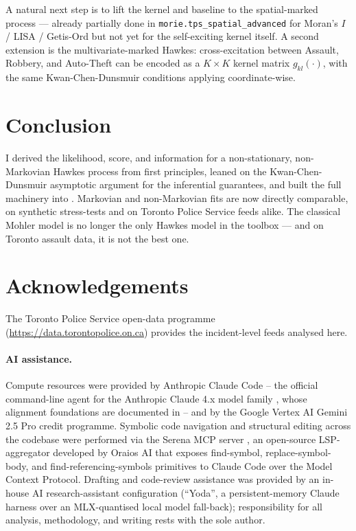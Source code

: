 \documentclass[article,shortnames,nojss]{jss}
\newcommand{\1}{\mathbbm{1}}
\theoremstyle{plain}
\theoremstyle{definition}
\begin{document}
A natural next step is to lift the kernel and baseline to the
spatial-marked process --- already partially done in
\texttt{morie.tps\_spatial\_advanced} for Moran's $I$ / LISA /
Getis-Ord but not yet for the self-exciting kernel itself.  A
second extension is the multivariate-marked Hawkes:
cross-excitation between Assault, Robbery, and Auto-Theft can be
encoded as a $K\times K$ kernel matrix
$g_{kl}(\cdot)$, with the same Kwan-Chen-Dunsmuir conditions
applying coordinate-wise.

\section{Conclusion}\label{sec:conclusion}

I derived the likelihood, score, and information for a
non-stationary, non-Markovian Hawkes process from first
principles, leaned on the Kwan-Chen-Dunsmuir asymptotic
argument for the inferential guarantees, and built the full
machinery into .  Markovian and non-Markovian fits
are now directly comparable, on synthetic stress-tests and on
Toronto Police Service feeds alike.  The classical Mohler
model is no longer the only Hawkes model in the toolbox ---
and on Toronto assault data, it is not the best one.

\section*{Acknowledgements}
The Toronto Police Service open-data programme
(\url{https://data.torontopolice.on.ca}) provides the incident-level
feeds analysed here.

\paragraph*{AI assistance.}
Compute resources were provided by Anthropic
Claude Code \citep{Anthropic2024ClaudeCode} -- the official
command-line agent for the Anthropic Claude 4.x model family
\citep{Anthropic2024ClaudeFamily}, whose alignment foundations
are documented in \citet{Bai2022ConstitutionalAI} -- and by the
Google Vertex AI \citep{GoogleCloud2024VertexAI} Gemini 2.5 Pro
\citep{GoogleDeepMind2024Gemini} credit programme.  Symbolic
code navigation and structural editing across the codebase were
performed via the Serena MCP server \citep{Oraios2024Serena}, an
open-source LSP-aggregator developed by Oraios AI that exposes
find-symbol, replace-symbol-body, and find-referencing-symbols
primitives to Claude Code over the Model Context Protocol.
Drafting and code-review assistance was provided by an in-house AI
research-assistant configuration (``Yoda'', a persistent-memory
Claude harness over an MLX-quantised local model fall-back);
responsibility for all analysis, methodology, and writing rests
with the sole author.
\end{document}

